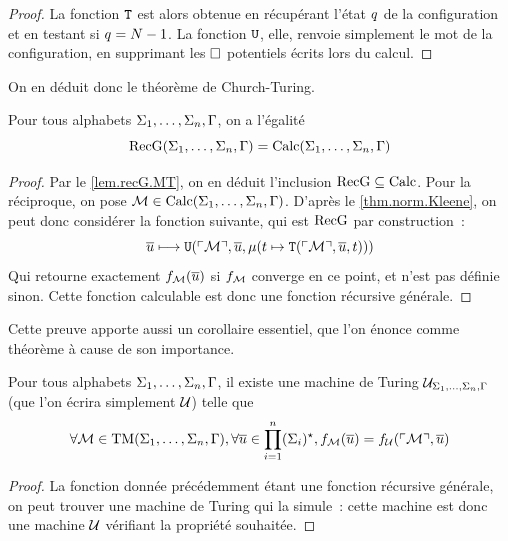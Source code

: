 \begin{proof}
  La fonction ${\normalfont\texttt{T}}$ est alors obtenue en récupérant l'état $q_{}$ de la
  configuration et en testant si $q_{} = N - 1$. La fonction ${\normalfont\texttt{U}}$, elle,
  renvoie simplement le mot de la configuration, en supprimant les $\square$
  potentiels écrits lors du calcul.
\end{proof}

On en déduit donc le théorème de Church-Turing.

\begin{theorem}
  Pour tous alphabets $\Sigma_1,\ldots,\Sigma_n,\Gamma$, on a l'égalité
  \[\operatorname{RecG}(\Sigma_1,\ldots,\Sigma_n,\Gamma) = \operatorname{Calc}(\Sigma_1,\ldots,\Sigma_n,\Gamma)\]
\end{theorem}

\begin{proof}
  Par le \cref{lem.recG.MT}, on en déduit l'inclusion $\operatorname{RecG}\subseteq\operatorname{Calc}$.
  Pour la réciproque, on pose $\mathcal{M} \in \operatorname{Calc}(\Sigma_1,\ldots,\Sigma_n,\Gamma)$.
  D'après le \cref{thm.norm.Kleene}, on peut donc considérer la fonction
  suivante, qui est $\operatorname{RecG}$ par construction~:
  \[\overline{u} \longmapsto {\normalfont\texttt{U}}(\ulcorner\mathcal{M}\urcorner,\overline{u},
  \mathbin{\mu}(t \mapsto {\normalfont\texttt{T}}(\ulcorner\mathcal{M}\urcorner,\overline{u},t)))\]
  Qui retourne exactement $f_{\mathcal{M}}(\overline{u})$ si $f_{\mathcal{M}}$ converge
  en ce point, et n'est pas définie sinon. Cette fonction calculable est donc
  une fonction récursive générale.
\end{proof}

Cette preuve apporte aussi un corollaire essentiel, que l'on énonce comme
théorème à cause de son importance.

\begin{theorem}\label{thm.MT.U}
  Pour tous alphabets $\Sigma_1,\ldots,\Sigma_n,\Gamma$, il existe une machine
  de Turing $\mathcal{U}_{\Sigma_1,\ldots,\Sigma_n,\Gamma}$ (que l'on écrira simplement
  $\UnTM$) telle que
  \[\forall \mathcal{M} \in \operatorname{TM}(\Sigma_1,\ldots,\Sigma_n,\Gamma),
  \forall \overline{u} \in \prod_{i = 1}^n (\Sigma_{i})^{\star},
  f_{\mathcal{M}}(\overline{u}) = f_{\mathcal{U}}(\ulcorner\mathcal{M}\urcorner, \overline{u})\]
  \index[notation]{$\UnTM$}
\end{theorem}

\begin{proof}
  La fonction donnée précédemment étant une fonction récursive générale, on peut
  trouver une machine de Turing qui la simule~: cette machine est donc une
  machine $\UnTM$ vérifiant la propriété souhaitée.
\end{proof}


